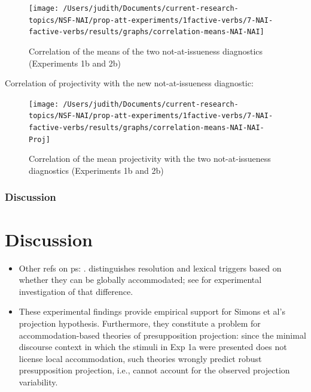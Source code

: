 \documentclass[11pt,fleqn]{article}
\newcommand{\6}{\mbox{$[\hspace*{-.6mm}[$}}
\newcommand{\9}{\mbox{$]\hspace*{-.6mm}]$}}
\begin{document}
\begin{figure}[!h]

\begin{center}

\texttt{[image: /Users/judith/Documents/current-research-topics/NSF-NAI/prop-att-experiments/1factive-verbs/7-NAI-factive-verbs/results/graphs/correlation-means-NAI-NAI]}
\end{center}

\caption{Correlation of the means of the two not-at-issueness diagnostics (Experiments 1b and 2b)}\label{f-corr3}
\end{figure}

Correlation of projectivity with the new not-at-issueness diagnostic:

\begin{figure}[!h]

\begin{center}

\texttt{[image: /Users/judith/Documents/current-research-topics/NSF-NAI/prop-att-experiments/1factive-verbs/7-NAI-factive-verbs/results/graphs/correlation-means-NAI-NAI-Proj]}
\end{center}

\caption{Correlation of the mean projectivity with the two not-at-issueness diagnostics (Experiments 1b and 2b)}\label{f-corr4}
\end{figure}

\subsubsection{Discussion}

\section{Discussion}\label{s5}

\begin{itemize}

\item Other refs on ps: \citealt{schwarz07,chemla09,tiemann-etal11}. \citealt{zeevat92} distinguishes resolution and lexical triggers based on whether they can be globally accommodated; see \citealt{amaral-cummins2015} for experimental investigation of that difference.

\item These experimental findings provide empirical support for Simons et al's projection hypothesis. Furthermore, they constitute a problem for accommodation-based theories of presupposition projection: since the minimal discourse context in which the stimuli in Exp 1a were presented does not license local accommodation, such theories wrongly predict robust presupposition projection, i.e., cannot account for the observed projection variability.

\end{itemize}
\end{document}
